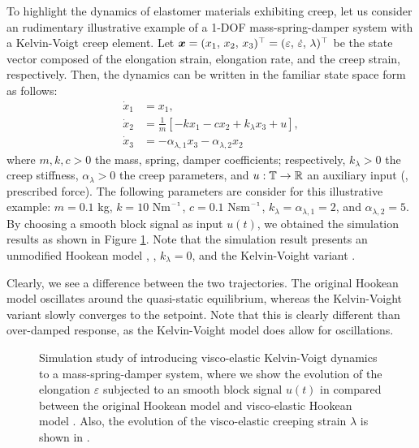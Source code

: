 \begin{example} To highlight the dynamics of elastomer materials exhibiting creep, let us consider an rudimentary illustrative example of a 1-DOF mass-spring-damper system with a Kelvin-Voigt creep element. Let ${\boldsymbol{x}} = (x_1,\,x_2,\,x_3)^\top = (\varepsilon,\, \dot{\varepsilon},\, \lambda)^\top$ be the state vector composed of the elongation strain, elongation rate, and the creep strain, respectively. Then, the dynamics can be written in the familiar state space form as follows:
%
\begin{align}
\dot{x}_1 & = x_1, \\
\dot{x}_2 & = \frac{1}{m}\left[ -k x_1 - c x_2 + k_\lambda x_3 + u \right], \\
\dot{x}_3 & = -\alpha_{\lambda,1}x_3 -\alpha_{\lambda,2}x_2
\end{align}
%
where $m,k,c>0$  the mass, spring, damper coefficients; respectively, $k_{\lambda}>0$ the creep stiffness, $\alpha_{\lambda}>0$ the creep parameters, and $u: \mathbb{T} \to \mathbb{R}$ an auxiliary input (\ie, prescribed force). The following parameters are consider for this illustrative example: $m = 0.1$ \si{\kilo \gram}, $k = 10$ Nm$\inv$, $c = 0.1$ Nsm$\inv$,
$k_{\lambda} = \alpha_{\lambda,1} = 2$, and $\alpha_{\lambda,2} = 5$. By choosing a smooth block signal as input $u(t)$, we obtained the simulation results as shown in Figure \ref{fig:C2:creep}. Note that the simulation result presents an unmodified Hookean model , \ie, $k_\lambda = 0$, and the Kelvin-Voight variant .

Clearly, we see a difference between the two trajectories. The original Hookean model oscillates around the quasi-static equilibrium, whereas the Kelvin-Voight variant slowly converges to the setpoint. Note that this is clearly different than over-damped response, as the Kelvin-Voight model does allow for oscillations. %
%
\begin{figure}[!h]
 \vspace{-1mm}
  
  \vspace{-0.2cm}
  \caption{Simulation study of introducing visco-elastic Kelvin-Voigt dynamics to a mass-spring-damper system, where we show the evolution of the elongation $\varepsilon$ subjected to an smooth block signal $u(t)$ in  compared between the original Hookean model  and visco-elastic Hookean model . Also, the evolution of the visco-elastic creeping strain $\lambda$ is shown in .}
  \vspace{-0.1cm}
  \label{fig:C2:creep}
\end{figure}

\end{example}
